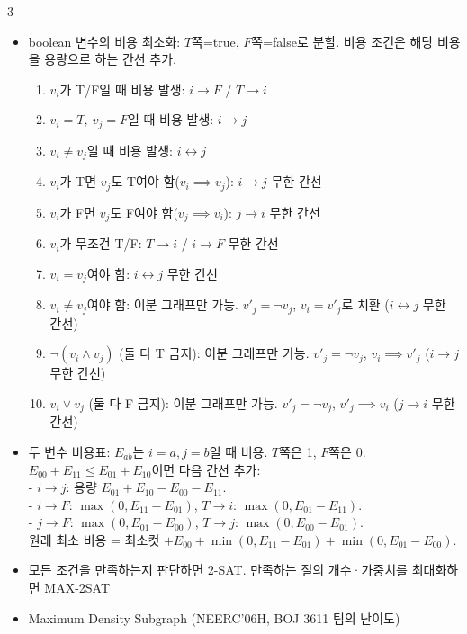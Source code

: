\documentclass[landscape, 8pt, a4paper, oneside]{extarticle}
\begin{document}
\begin{multicols*}{3}
  \begin{itemize}
    \item boolean 변수의 비용 최소화: $T$쪽=true, $F$쪽=false로 분할. 비용 조건은 해당 비용을 용량으로 하는 간선 추가.
    \begin{enumerate}
      \item $v_i$가 T/F일 때 비용 발생: $i\to F$ / $T\to i$
      \item $v_i=T,\ v_j=F$일 때 비용 발생: $i\to j$
      \item $v_i \ne v_j$일 때 비용 발생: $i\leftrightarrow j$
      \item $v_i$가 T면 $v_j$도 T여야 함($v_i \implies v_j$): $i\to j$ 무한 간선
      \item $v_i$가 F면 $v_j$도 F여야 함($v_j \implies v_i$): $j\to i$ 무한 간선
      \item $v_i$가 무조건 T/F: $T\to i$ / $i\to F$ 무한 간선
      \item $v_i = v_j$여야 함: $i\leftrightarrow j$ 무한 간선
      \item $v_i \ne v_j$여야 함: 이분 그래프만 가능. $v'_j = \neg v_j$, $v_i = v'_j$로 치환 ($i \leftrightarrow j$ 무한 간선)
      \item $\neg(v_i \land v_j)$ (둘 다 T 금지): 이분 그래프만 가능. $v'_j = \neg v_j$, $v_i \implies v'_j$ ($i \to j$ 무한 간선)
      \item $v_i \lor v_j$ (둘 다 F 금지): 이분 그래프만 가능. $v'_j = \neg v_j$, $v'_j \implies v_i$ ($j \to i$ 무한 간선)
    \end{enumerate}
    \item 두 변수 비용표: $E_{ab}$는 $i=a,j=b$일 때 비용. $T$쪽은 1, $F$쪽은 0.\\
    $E_{00}+E_{11}\le E_{01}+E_{10}$이면 다음 간선 추가:\\
    - $i\to j$: 용량 $E_{01}+E_{10}-E_{00}-E_{11}$.\\
    - $i\to F$: $\max(0,E_{11}-E_{01})$, $T\to i$: $\max(0,E_{01}-E_{11})$.\\
    - $j\to F$: $\max(0,E_{01}-E_{00})$, $T\to j$: $\max(0,E_{00}-E_{01})$.\\
    원래 최소 비용 = 최소컷 $+E_{00}+\min(0,E_{11}-E_{01})+\min(0,E_{01}-E_{00})$.
    \item 모든 조건을 만족하는지 판단하면 2-SAT. 만족하는 절의 개수·가중치를 최대화하면 MAX-2SAT
    \item Maximum Density Subgraph (NEERC'06H, BOJ 3611 팀의 난이도)

\end{itemize}
\end{multicols*}
\end{document}
